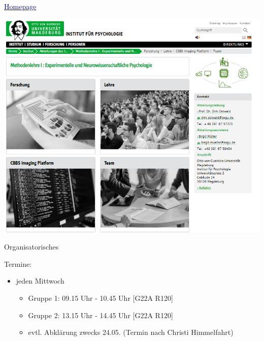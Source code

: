 \documentclass[
  8pt,
  ignorenonframetext,
]{beamer}
\providecommand{\tightlist}{%
  \setlength{\itemsep}{0pt}\setlength{\parskip}{0pt}}
\begin{document}
\begin{frame}{}
\protect\hypertarget{section-3}{}
\href{https://www.ipsy.ovgu.de/methodenlehre_I-path-980,1404.html}{\textcolor{darkblue}{Homepage}}
\vspace{3mm}

\begin{center}\includegraphics[width=0.75\linewidth]{../Abbildungen/Lehrstuhlseite} \end{center}
\end{frame}

\begin{frame}{Organisatorisches}
\protect\hypertarget{organisatorisches}{}
\vspace{3mm}

Termine:

\begin{itemize}
\tightlist
\item
  jeden Mittwoch

  \begin{itemize}
  \tightlist
  \item
    Gruppe 1: 09.15 Uhr - 10.45 Uhr {[}G22A R120{]}
  \item
    Gruppe 2: 13.15 Uhr - 14.45 Uhr {[}G22A R120{]}
  \item
    evtl. Abklärung zwecks 24.05. (Termin nach Christi Himmelfahrt)
  \end{itemize}
\end{itemize}
\end{frame}
\end{document}
